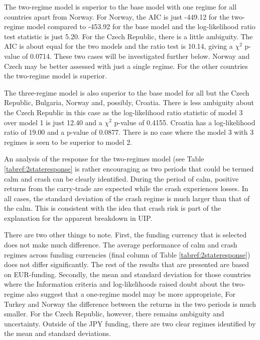 \documentclass[12pt, a4paper, oneside]{article}\usepackage[]{graphicx}\usepackage[]{color}
\begin{document}
The two-regime model is superior to the base model with one regime for all countries apart from Norway.  For Norway, the AIC is just -449.12 for the two-regime model compared to -453.92 for the base model and the log-likelihood ratio test statistic is just 5.20.  For the Czech Republic, there is a little ambiguity.  The AIC is about equal for the two models and the ratio test is 10.14, giving a $\chi^2$ p-value of 0.0714. These two cases will be investigated further below. Norway and Czech may be better assessed with just a single regime. For the other countries the two-regime model is superior.  

The three-regime model is also superior to the base model for all but the Czech Republic, Bulgaria, Norway and, possibly, Croatia.  There is less ambiguity about the Czech Republic in this case as the log-likelihood ratio statistic of model 3 over model 1 is just 12.40 and a $\chi^2$ p-value of 0.4155.  Croatia has a log-likelihood ratio of 19.00 and a p-value of 0.0877.  There is no case where the model 3 with 3 regimes is seen to be superior to model 2.  

An analysis of the response for the two-regimes model (see Table \ref{tabref:2stateresponse} is rather encouraging as two periods that could be termed calm and crash can be clearly identified. During the period of calm, positive returns from the carry-trade are expected while the crash experiences losses.  In all cases, the standard deviation of the crash regime is much larger than that of the calm.  This is consistent with the idea that crash risk is part of the explanation for the apparent breakdown in UIP.  

There are two other things to note.  First, the funding currency that is selected does not make much difference.   The average performance of calm and crash regimes across funding currencies (final column of Table \ref{tabref:2stateresponse}) does not differ significantly.  The rest of the results that are presented are based on EUR-funding.  Secondly, the mean and standard deviation for those countries where the Information criteria and log-likelihoods raised doubt about the two-regime also suggest that a one-regime model may be more appropriate,   For Turkey and Norway the difference between the returns in the two periods is much smaller.  For the Czech Republic, however, there remains ambiguity and uncertainty. Outside of the JPY funding, there are two clear regimes identified by the mean and standard deviations. 
\end{document}
